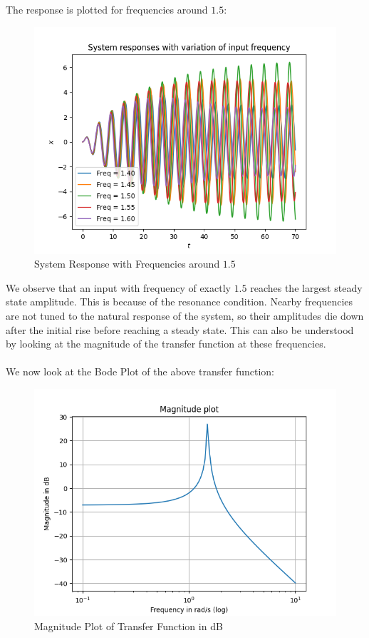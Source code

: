 \documentclass{article}
\begin{document}
\noindent
The response is plotted for frequencies around \(1.5\):
\\
\begin{figure}[tbh!]
    \centering
    \includegraphics[scale=0.6]{plots/System responses with variation of input frequency.png}
    \caption{System Response with Frequencies around \(1.5\)}
    \label{fig:System Response with Frequencies around 1.5}
\end{figure}    
\newpage
We observe that an input with frequency of exactly \(1.5\) reaches the
largest steady state amplitude. This is because of the  resonance condition. 
Nearby frequencies are not tuned to the natural response of
the system, so their amplitudes die down after the initial rise before
reaching a steady state. This can also be understood by looking at the
magnitude of the transfer function at these frequencies.
\\ \\
We now look at the Bode Plot of the above transfer function: 
\\
\begin{figure}[tbh!]
    \centering
    \includegraphics[scale=0.6]{plots/Magnitude plot.png}
    \caption{Magnitude Plot of Transfer Function in dB}
    \label{fig:Magnitude Plot 1}
\end{figure}
\end{document}
